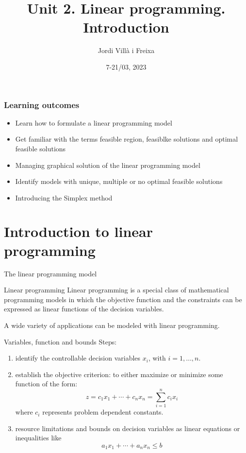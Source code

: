 \documentclass[c]{beamer}
\title[Introduction]{Unit 2. Linear programming. Introduction}
\author{Jordi Villà i Freixa}
\institute[FCTE]{
Universitat de Vic - Universitat Central de Catalunya \\
Study Abroad. Operations Research\\
\medskip
\textit{jordi.villa@uvic.cat}
}
\date{7-21/03, 2023}
\begin{document}
\begin{frame}
\titlepage
\end{frame}




\begin{frame}
\frametitle{Learning outcomes}
\begin{itemize}
  \item Learn how to formulate a linear programming model
  \item Get familiar with the terms feasible region, feasiblke solutions and optimal feasible solutions
  \item Managing graphical solution of the linear programming model
  \item Identify models with unique, multiple or no optimal feasible solutions
  \item Introducing the Simplex method
\end{itemize}
\end{frame}

\section{Introduction to linear programming}

\begin{frame}{The linear programming model}

  \begin{block}{Linear programming}
    Linear programming is a special class of mathematical programming models in which the objective function and the constraints can be expressed as linear functions of the decision variables.
  \end{block}

  A wide variety of applications can be modeled with linear programming.
\end{frame}

\begin{frame}{Variables, function and bounds}
  Steps:
\begin{enumerate}
  \item identify the controllable decision variables $x_i$, with $i=1,\ldots,n$.
  \item establish the objective criterion: to either maximize or minimize some function of the form:
  \[
    z = c_1 x_1 +\cdots + c_n x_n = \sum_{i=1}^n c_i x_i
  \]
  where $c_i$ represents problem dependent constants.
  \item resource limitations and bounds on decision variables as linear equations or inequalities like
  \[
     a_1 x_1 +\cdots + a_n x_n \leq b
  \]
\end{enumerate}
\end{frame}
\end{document}
